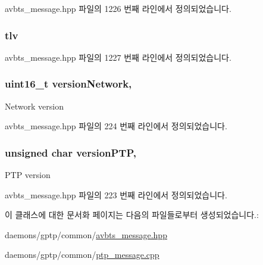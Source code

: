 avbts\+\_\+message.\+hpp 파일의 1226 번째 라인에서 정의되었습니다.

\subsubsection[{\texorpdfstring{tlv}{tlv}}]{ tlv\hspace{0.3cm}{\ttfamily [private]}}\hypertarget{class_p_t_p_message_signalling_ab458dc952682abd8077ce12fbff3d1d6}{}\label{class_p_t_p_message_signalling_ab458dc952682abd8077ce12fbff3d1d6}


avbts\+\_\+message.\+hpp 파일의 1227 번째 라인에서 정의되었습니다.

\subsubsection[{\texorpdfstring{version\+Network}{versionNetwork}}]{\setlength{\rightskip}{0pt plus 5cm}uint16\+\_\+t version\+Network\hspace{0.3cm}{\ttfamily [protected]}, {\ttfamily [inherited]}}\hypertarget{class_p_t_p_message_common_a79d99d7b79ee6ad4bbd03b301ccccb53}{}\label{class_p_t_p_message_common_a79d99d7b79ee6ad4bbd03b301ccccb53}
Network version 

avbts\+\_\+message.\+hpp 파일의 224 번째 라인에서 정의되었습니다.

\subsubsection[{\texorpdfstring{version\+P\+TP}{versionPTP}}]{\setlength{\rightskip}{0pt plus 5cm}unsigned char version\+P\+TP\hspace{0.3cm}{\ttfamily [protected]}, {\ttfamily [inherited]}}\hypertarget{class_p_t_p_message_common_aebd1e0693c6170ff1b08b2471db92a80}{}\label{class_p_t_p_message_common_aebd1e0693c6170ff1b08b2471db92a80}
P\+TP version 

avbts\+\_\+message.\+hpp 파일의 223 번째 라인에서 정의되었습니다.



이 클래스에 대한 문서화 페이지는 다음의 파일들로부터 생성되었습니다.\+:\begin{DoxyCompactItemize}
\item 
daemons/gptp/common/\hyperlink{avbts__message_8hpp}{avbts\+\_\+message.\+hpp}\item 
daemons/gptp/common/\hyperlink{ptp__message_8cpp}{ptp\+\_\+message.\+cpp}\end{DoxyCompactItemize}
